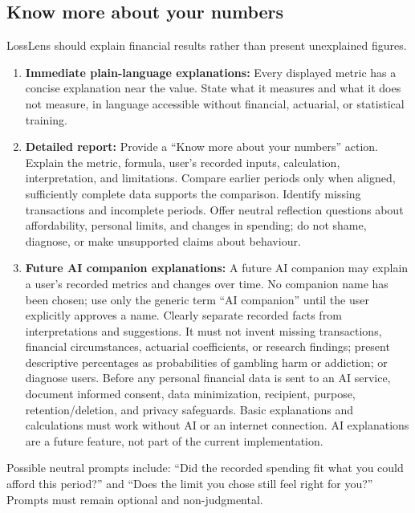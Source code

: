\documentclass[11pt,a4paper]{article}
\begin{document}
\subsection{Know more about your numbers}
LossLens should explain financial results rather than present unexplained figures.
\begin{enumerate}
  \item \textbf{Immediate plain-language explanations:} Every displayed metric has a concise explanation near the value. State what it measures and what it does not measure, in language accessible without financial, actuarial, or statistical training.
  \item \textbf{Detailed report:} Provide a ``Know more about your numbers'' action. Explain the metric, formula, user's recorded inputs, calculation, interpretation, and limitations. Compare earlier periods only when aligned, sufficiently complete data supports the comparison. Identify missing transactions and incomplete periods. Offer neutral reflection questions about affordability, personal limits, and changes in spending; do not shame, diagnose, or make unsupported claims about behaviour.
  \item \textbf{Future AI companion explanations:} A future AI companion may explain a user's recorded metrics and changes over time. No companion name has been chosen; use only the generic term ``AI companion'' until the user explicitly approves a name. Clearly separate recorded facts from interpretations and suggestions. It must not invent missing transactions, financial circumstances, actuarial coefficients, or research findings; present descriptive percentages as probabilities of gambling harm or addiction; or diagnose users. Before any personal financial data is sent to an AI service, document informed consent, data minimization, recipient, purpose, retention/deletion, and privacy safeguards. Basic explanations and calculations must work without AI or an internet connection. AI explanations are a future feature, not part of the current implementation.
\end{enumerate}
Possible neutral prompts include: ``Did the recorded spending fit what you could afford this period?'' and ``Does the limit you chose still feel right for you?'' Prompts must remain optional and non-judgmental.
\end{document}
